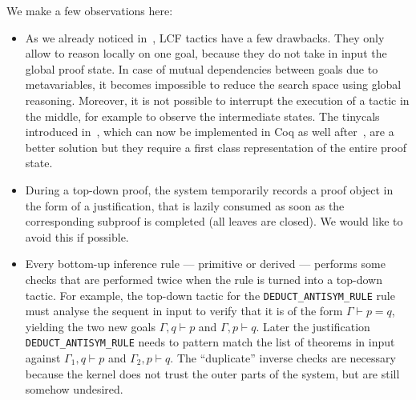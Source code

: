 \documentclass[preprint]{sigplanconf}
\begin{document}
We make a few observations here:
\begin{itemize}
\item As we already noticed in~\cite{csc2}, LCF tactics have a few drawbacks. They only allow to reason locally on one goal, because they do not take in input the global proof state. In case of mutual dependencies between goals due to metavariables, it becomes impossible to reduce the search space using global reasoning. Moreover, it is not possible to interrupt the execution of a tactic in the middle, for example to observe the intermediate states. The tinycals introduced in~\cite{csc2}, which can now be implemented in Coq as well after~\cite{spiwack}, are a better solution but they require a first class representation of the entire proof state.
\item During a top-down proof, the system temporarily records a proof object in the form of a justification, that is lazily consumed as soon as the corresponding subproof is completed (all leaves are closed). We would like to avoid this if possible.
\item Every bottom-up inference rule --- primitive or derived --- performs some checks that are performed twice when the rule is turned into a top-down tactic.
For example, the top-down tactic for the \verb+DEDUCT_ANTISYM_RULE+ rule must analyse the sequent in input to verify that it is of the form $\Gamma \vdash p=q$, yielding the two new goals $\Gamma, q \vdash p$ and $\Gamma, p \vdash q$. Later the justification \verb+DEDUCT_ANTISYM_RULE+ needs to pattern match the list of theorems in input against $\Gamma_1,q \vdash p$ and $\Gamma_2,p \vdash q$. The ``duplicate'' inverse checks are necessary because the kernel does not trust the outer parts of the system, but are still somehow undesired.
\end{itemize}
\end{document}

